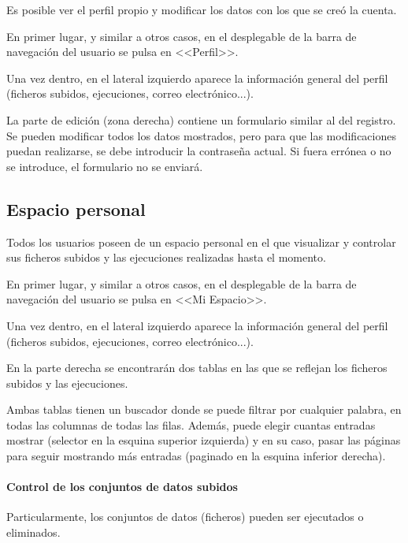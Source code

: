 Es posible ver el perfil propio y modificar los datos con los que se creó la
cuenta.

En primer lugar, y similar a otros casos, en el desplegable de la barra de
navegación del usuario se pulsa en <<Perfil>>.


Una vez dentro, en el lateral izquierdo aparece la información general del
perfil (ficheros subidos, ejecuciones, correo electrónico...).

La parte de edición (zona derecha) contiene un formulario similar al del
registro. Se pueden modificar todos los datos mostrados, pero para que las
modificaciones puedan realizarse, se debe introducir la contraseña actual. Si
fuera errónea o no se introduce, el formulario no se enviará.

\label{mu:perfil}

\subsection{Espacio personal}

Todos los usuarios poseen de un espacio personal en el que visualizar y
controlar sus ficheros subidos y las ejecuciones realizadas hasta el momento.

En primer lugar, y similar a otros casos, en el desplegable de la barra de
navegación del usuario se pulsa en <<Mi Espacio>>.


Una vez dentro, en el lateral izquierdo aparece la información general del
perfil (ficheros subidos, ejecuciones, correo electrónico...).

En la parte derecha se encontrarán dos tablas en las que se reflejan los
ficheros subidos y las ejecuciones.


Ambas tablas tienen un buscador donde se puede filtrar por cualquier palabra, en
todas las columnas de todas las filas. Además, puede elegir cuantas entradas
mostrar (selector en la esquina superior izquierda) y en su caso, pasar las
páginas para seguir mostrando más entradas (paginado en la esquina inferior
derecha).

\paragraph{Control de los conjuntos de datos subidos} Particularmente, los
conjuntos de datos (ficheros) pueden ser ejecutados o eliminados.

